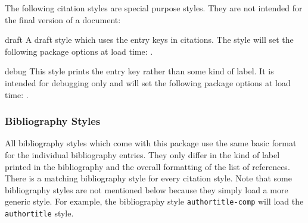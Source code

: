 \documentclass{ltxdockit}[2011/03/25]
\begin{document}
The following citation styles are special purpose styles. They are not intended for the final version of a document:

\begin{marglist}

\item[draft]
A draft style which uses the entry keys in citations. The style will set the following package options at load time: .

\item[debug]
This style prints the entry key rather than some kind of label. It is intended for debugging only and will set the following package options at load time: .

\end{marglist}

\subsubsection{Bibliography Styles}
\label{use:xbx:bbx}

All bibliography styles which come with this package use the same basic format for the individual bibliography entries. They only differ in the kind of label printed in the bibliography and the overall formatting of the list of references. There is a matching bibliography style for every citation style. Note that some bibliography styles are not mentioned below because they simply load a more generic style. For example, the bibliography style \texttt{authortitle-comp} will load the \texttt{authortitle} style.
\end{document}
